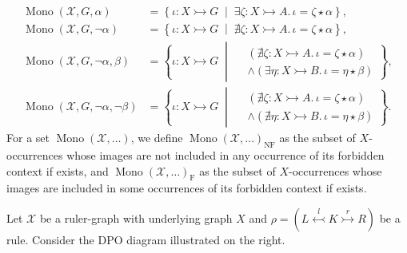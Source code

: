 \begin{notation}
\begin{align*}
        \operatorname{Mono}(\mathcal{X},G,\alpha) &= \left\{ \iota \colon X \rightarrowtail G 
        \;\middle|\; 
        \exists \zeta \colon X \rightarrowtail A.\, \iota = \zeta \star \alpha \right\}, 
        \\
        \operatorname{Mono}(\mathcal{X},G,\lnot \alpha) &= \left\{ \iota \colon X \rightarrowtail G 
        \;\middle|\; 
        \nexists \zeta \colon X \rightarrowtail A.\, \iota = \zeta \star \alpha \right\}, 
        \\
        \operatorname{Mono}(\mathcal{X},G,\lnot \alpha, \beta) &= \left\{ 
            \iota \colon X \rightarrowtail G \;\middle|\; 
                \begin{aligned}  
                    &(\nexists \zeta \colon X \rightarrowtail A.\, \iota = \zeta \star \alpha) \\ 
                    &\land (\exists \eta \colon X \rightarrowtail B.\, \iota = \eta \star \beta)
                \end{aligned}
        \right\},
        \\
        \operatorname{Mono}(\mathcal{X},G,\lnot \alpha, \lnot \beta) &= \left\{ 
            \iota \colon X \rightarrowtail G \;\middle|\; 
                \begin{aligned}
                    &(\nexists \zeta \colon X \rightarrowtail A.\, \iota = \zeta \star \alpha) \\
                    &\land (\nexists \eta \colon X \rightarrowtail B.\, \iota = \eta \star \beta)
                \end{aligned}
        \right\}.
    \end{align*}
    For a set $\operatorname{Mono}(\mathcal{X},\dots)$, we define $\operatorname{Mono}(\mathcal{X},\dots)_{\operatorname{NF}}$ as the subset of \( X \)-occurrences whose images are not included in any occurrence of its forbidden context if exists, and  $\operatorname{Mono}(\mathcal{X},\dots)_{\operatorname{F}}$ as the subset of \( X \)-occurrences whose images are included in some occurrences of its forbidden context if exists. 
\end{notation}
\noindent
\begin{minipage}{0.7\textwidth}\setlength{\parindent}{1em}
    Let $\mathcal{X}$ be a ruler-graph with underlying graph $X$ and \( \rho = (L \overset{l}{\leftarrowtail} K \overset{r}{\rightarrowtail} R) \) be a rule. 
    Consider the DPO diagram illustrated on the right. 
\end{minipage}%
